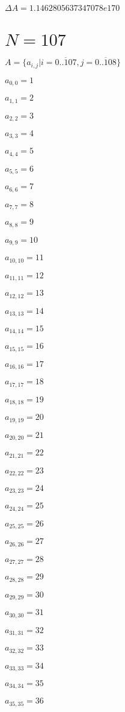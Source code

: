 \documentclass[a4paper,12pt]{article}
\begin{document}
$\Delta A = 1.1462805637347078e170$



\section{ $N = 107$ }
$A = \{ a _{ i, j } | i = \overline { 0..107 }, j = \overline { 0..108 } \}$

$a _{ 0, 0 } = 1$

$a _{ 1, 1 } = 2$

$a _{ 2, 2 } = 3$

$a _{ 3, 3 } = 4$

$a _{ 4, 4 } = 5$

$a _{ 5, 5 } = 6$

$a _{ 6, 6 } = 7$

$a _{ 7, 7 } = 8$

$a _{ 8, 8 } = 9$

$a _{ 9, 9 } = 10$

$a _{ 10, 10 } = 11$

$a _{ 11, 11 } = 12$

$a _{ 12, 12 } = 13$

$a _{ 13, 13 } = 14$

$a _{ 14, 14 } = 15$

$a _{ 15, 15 } = 16$

$a _{ 16, 16 } = 17$

$a _{ 17, 17 } = 18$

$a _{ 18, 18 } = 19$

$a _{ 19, 19 } = 20$

$a _{ 20, 20 } = 21$

$a _{ 21, 21 } = 22$

$a _{ 22, 22 } = 23$

$a _{ 23, 23 } = 24$

$a _{ 24, 24 } = 25$

$a _{ 25, 25 } = 26$

$a _{ 26, 26 } = 27$

$a _{ 27, 27 } = 28$

$a _{ 28, 28 } = 29$

$a _{ 29, 29 } = 30$

$a _{ 30, 30 } = 31$

$a _{ 31, 31 } = 32$

$a _{ 32, 32 } = 33$

$a _{ 33, 33 } = 34$

$a _{ 34, 34 } = 35$

$a _{ 35, 35 } = 36$
\end{document}
